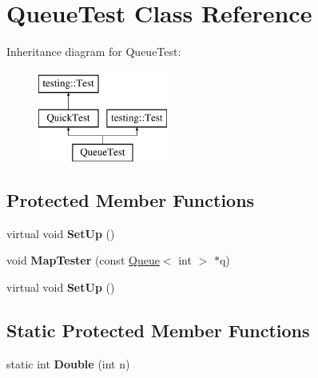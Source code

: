 \hypertarget{class_queue_test}{}\section{Queue\+Test Class Reference}
\label{class_queue_test}
Inheritance diagram for Queue\+Test\+:\begin{figure}[H]
\begin{center}
\leavevmode
\includegraphics[height=3.000000cm]{class_queue_test}
\end{center}
\end{figure}
\subsection*{Protected Member Functions}
\begin{DoxyCompactItemize}
\item 
\mbox{\label{class_queue_test_a91e69958f086239a523864d6b94ab174}} 
virtual void {\bfseries Set\+Up} ()
\item 
\mbox{\label{class_queue_test_a7f1661cd16c428a130d6ac1e4246eaab}} 
void {\bfseries Map\+Tester} (const \mbox{\hyperlink{class_queue}{Queue}}$<$ int $>$ $\ast$q)
\item 
\mbox{\label{class_queue_test_a91e69958f086239a523864d6b94ab174}} 
virtual void {\bfseries Set\+Up} ()
\end{DoxyCompactItemize}
\subsection*{Static Protected Member Functions}
\begin{DoxyCompactItemize}
\item 
\mbox{\label{class_queue_test_a2c7e0d1edb558dbbc4c085316d3d1ee6}} 
static int {\bfseries Double} (int n)
\end{DoxyCompactItemize}
